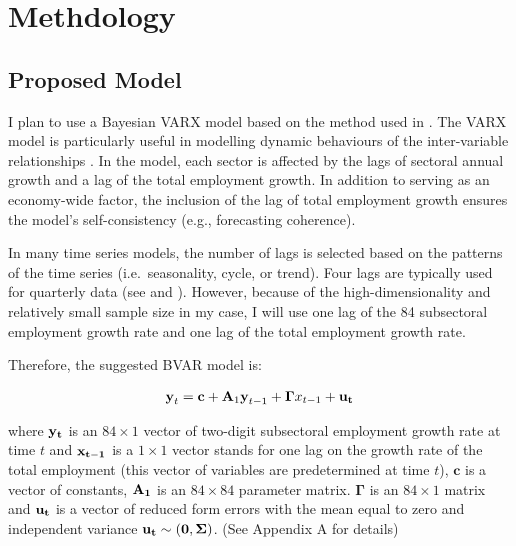 \documentclass{monashthesis}
\begin{document}
\clearpage

\hypertarget{methdology}{%
\chapter{Methdology}\label{methdology}}

\hypertarget{proposed-model}{%
\section{Proposed Model}\label{proposed-model}}

I plan to use a Bayesian VARX model based on the method used in \textcite{anderson2020}. The VARX model is particularly useful in modelling dynamic behaviours of the inter-variable relationships \autocite{warsono2019}. In the model, each sector is affected by the lags of sectoral annual growth and a lag of the total employment growth. In addition to serving as an economy-wide factor, the inclusion of the lag of total employment growth ensures the model's self-consistency (e.g., forecasting coherence).

In many time series models, the number of lags is selected based on the patterns of the time series (i.e.~seasonality, cycle, or trend). Four lags are typically used for quarterly data (see \textcite{anderson2020} and \textcite{stock2001}). However, because of the high-dimensionality and relatively small sample size in my case, I will use one lag of the 84 subsectoral employment growth rate and one lag of the total employment growth rate.

Therefore, the suggested BVAR model is:

\[
\begin{aligned}
\textbf{y}_t=\textbf{c}+\textbf{A}_1 \textbf{y}_{t-1}+\boldsymbol{\Gamma}{x}_{t-1}+\bf{u}_t
\end{aligned}
\]

where \(\bf{y}_t\) is an \(84\times1\) vector of two-digit subsectoral employment growth rate at time \(t\) and \(\bf{x}_{t-1}\) is a \(1\times1\) vector stands for one lag on the growth rate of the total employment (this vector of variables are predetermined at time \(t\)), \(\textbf{c}\) is a vector of constants, \(\bf{A}_{1}\) is an \(84\times84\) parameter matrix. \(\boldsymbol{\Gamma}\) is an \(84\times1\) matrix and \(\bf{u}_t\) is a vector of reduced form errors with the mean equal to zero and independent variance \(\bf{u}_t \sim (0,\boldsymbol{\Sigma})\). (See Appendix A for details)
\end{document}
